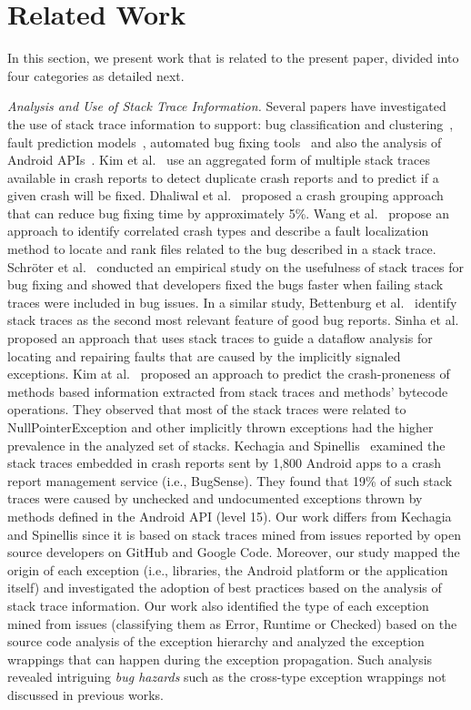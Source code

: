 \section{Related Work}
\label{sec:rele}

In this section, we present work that is related to the present paper, divided into
four categories as detailed next.

\textit{Analysis and Use of Stack Trace Information.} Several papers have
investigated the use of stack trace information to support: bug classification
and clustering~\cite{wang2013improving, kim2011crash, dhaliwal2011classifying},
fault prediction models~\cite{kim2013predicting}, automated
bug fixing tools~\cite{sinha2009fault} and also the analysis of Android APIs~\cite{kechagia2014}.
Kim et al.~\cite{kim2011crash} use an
aggregated form of multiple stack traces available in crash reports to detect
duplicate crash reports and to predict if a given crash will be fixed. Dhaliwal
et al.~\cite{dhaliwal2011classifying} proposed a crash grouping approach that
can reduce bug fixing time by approximately 5\%. Wang et
al.~\cite{wang2013improving} propose an approach to identify correlated crash
types and describe a fault localization method to locate and rank files related
to the bug described in a stack trace. Schr\"oter et al.~\cite{schroter2010stack}
conducted an empirical study on the usefulness of stack traces for bug fixing
and showed that developers fixed the bugs faster when failing stack traces were
included in bug issues.  In a similar study, Bettenburg et
al.~\cite{bettenburg2008makes} identify stack traces as the second most relevant
 feature of good bug reports.  Sinha et al.~\cite{sinha2009fault} proposed an
approach that uses stack traces to guide a dataflow analysis for locating and
repairing faults that are caused by the implicitly signaled exceptions. Kim
at al.~\cite{kim2013predicting} proposed an approach to predict the
crash-proneness of methods based information extracted from stack traces and
methods' bytecode operations.  They observed that most of the stack traces were
related to NullPointerException and other implicitly thrown exceptions had
the higher prevalence in the analyzed set of stacks. Kechagia and Spinellis~\cite{kechagia2014}
examined the stack traces embedded in crash reports sent by 1,800 Android apps
to a crash report management service (i.e., BugSense). They found that 19\% of such stack traces
were caused by unchecked and undocumented exceptions thrown by methods defined in the
Android API (level 15). Our work differs from Kechagia and Spinellis since it is based on
stack traces mined from issues reported by open source developers on GitHub and Google Code.
Moreover, our study mapped the origin of each exception
(i.e., libraries, the Android platform or the application itself) and investigated
the adoption of best practices based on the analysis of stack trace information.
Our work also identified the type of each exception mined from issues
(classifying them as Error, Runtime or Checked) based on the source code
analysis of the exception hierarchy and analyzed the exception wrappings that can
happen during the exception propagation.  Such analysis revealed intriguing
\emph{bug hazards} such as the cross-type exception wrappings not discussed in previous works.

